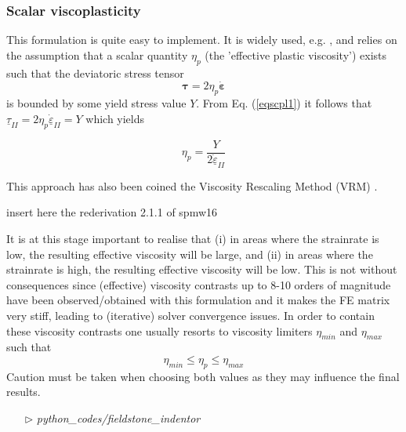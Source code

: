 \subsubsection{Scalar viscoplasticity}

This formulation is quite easy to implement. It is widely used, e.g. \cite{will92,thfb08,spmw16}, and relies on the assumption that 
a scalar quantity $\eta_p$ (the 'effective plastic viscosity') exists such that the deviatoric stress tensor 
\begin{equation}
{\bm \tau}=2\eta_p \dot{\bm\varepsilon} \label{eqscpl1}
\end{equation}
is bounded by some yield stress value $Y$.
From Eq. (\ref{eqscpl1}) it follows that $\underline{\tau}_{II}= 2\eta_p \dot{\underline{\varepsilon}}_{II}=Y$ which yields
\begin{mdframed}[backgroundcolor=blue!5]
\[
\eta_p = \frac{Y}{2 \dot{\underline{\varepsilon}}_{II}}
\]
\end{mdframed}
This approach has also been coined the Viscosity Rescaling Method (VRM) \cite{kacha04}.  

{\color{red} insert here the rederivation 2.1.1 of spmw16}

It is at this stage important to realise that (i) in areas where the strainrate is low, the resulting effective viscosity will be large, and 
(ii) in areas where the strainrate is high, the resulting effective viscosity will be low. This is not without consequences since 
(effective) viscosity contrasts up to 8-10 orders of magnitude have been observed/obtained with this formulation and it makes the FE 
matrix very stiff, leading to (iterative) solver convergence issues.
In order to contain these viscosity contrasts one usually resorts to viscosity limiters $\eta_{min}$ and $\eta_{max}$ such that 
\[
\eta_{min} \leq \eta_p \leq \eta_{max}
\]
Caution must be taken when choosing both values as they may influence the final results.


\begin{mdframed}[backgroundcolor=green!5]
\begin{itemize}
\item[$\triangleright$] {\sl python\_codes/fieldstone\_indentor}
\end{itemize}
\end{mdframed}




